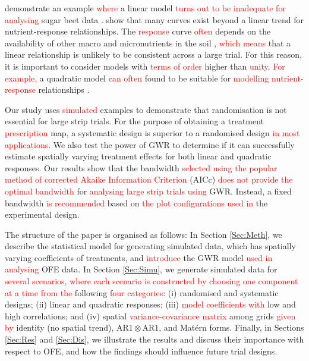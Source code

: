 \documentclass[a4paper]{article} 	%
\newcommand{\Matern}{Mat\'ern }
\newcommand{\AR}{\mathrm{AR1}}
\newcommand{\revision}[1]{\textcolor{red}{#1}}
\begin{document}
\textcite{Piepho2018Tutorial} demonstrate an example \revision{where} a linear model \revision{turns out to be inadequate} \revision{for analysing} sugar beet data \parencite{Petersen1994Agricultural}. \textcite{Glynn2007} show that many curves exist beyond a linear trend for nutrient-response relationships. The \revision{response} curve \revision{often} depends on the availability of other macro and micronutrients in the soil \parencite{Marschner2011}, \revision{which means } that a linear relationship is unlikely to be consistent across a large trial. For this reason, it is important to consider models with \revision{terms of order} higher than \revision{unity}. \revision{For example,} a quadratic model \revision{can often} found to be suitable for \revision{modelling nutrient-response} relationships \parencite{Piepho2018Tutorial, Liben2019}. 



% 

Our study uses \revision{simulated} examples to demonstrate that randomisation is not essential for large strip trials. For the purpose of obtaining a treatment \revision{prescription} map, a systematic design is superior to a randomised design \revision{in most applications}. We also test the power of GWR to determine if it can successfully estimate spatially varying treatment effects for both linear and quadratic responses. Our results show that the bandwidth \revision{selected using the popular method of corrected Akaike Information Criterion} (AICc) \revision{does not provide the optimal bandwidth} for \revision{analysing large strip trials using} GWR. Instead, a fixed bandwidth \revision{is recommended} based on \revision{the plot configurations used in} the experimental design.


The structure of the paper is organised as follows: In Section \ref{Sec:Meth}, we describe the statistical model for generating simulated data, which has spatially varying coefficients of treatments, and \revision{introduce} the GWR model \revision{used in analysing} OFE data. In Section \ref{Sec:Simu}, we generate simulated data for \revision{several scenarios, where each scenario is constructed by choosing one component at a time from the} following \revision{four categories}: (i) randomised and systematic designs; (ii) linear and quadratic responses; (iii) \revision{model coefficients with} low and high correlations; and (iv) spatial \revision{variance-covariance matrix} among grids \revision{given by} identity (no spatial trend), $\AR\otimes\AR$, and \Matern forms. Finally, in Sections \ref{Sec:Res} and \ref{Sec:Dis}, we illustrate the results and discuss their importance with respect to OFE, and how the findings should influence future trial designs. 
\end{document}
